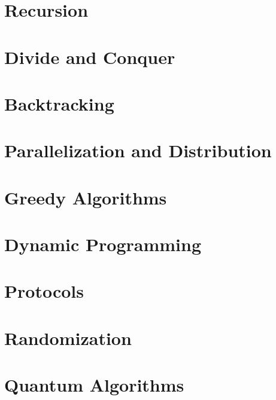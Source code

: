 \documentclass{book}
\begin{document}
\chapter{Recursion}


\chapter{Divide and Conquer}
 
\chapter{Backtracking}

\chapter{Parallelization and Distribution}


\chapter{Greedy Algorithms}\label{sec:ad:greedy}



\chapter{Dynamic Programming}

\chapter{Protocols}
 

\chapter{Randomization}
 
 
\chapter{Quantum Algorithms}
 
\end{document}
